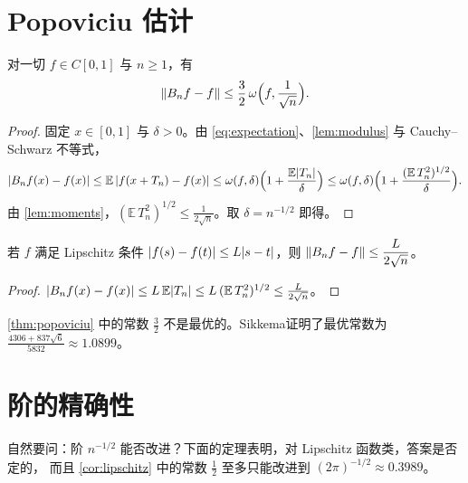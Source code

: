 \documentclass{mojing-paper}
\begin{document}
\section{Popoviciu 估计}

\begin{theorem}[Popoviciu]\label{thm:popoviciu}
对一切 $f\in C[0,1]$ 与 $n\ge1$，有
\[
  \lVert B_nf-f\rVert\le\frac32\,\omega\Bigl(f,\frac{1}{\sqrt n}\Bigr).
\]
\end{theorem}

\begin{proof}
固定 $x\in[0,1]$ 与 $\delta>0$。由 \cref{eq:expectation}、\cref{lem:modulus} 与 Cauchy--Schwarz 不等式，
\[
  \lvert B_nf(x)-f(x)\rvert\le\mathbb{E}\,\lvert f(x+T_n)-f(x)\rvert
  \le\omega(f,\delta)\Bigl(1+\frac{\mathbb{E}\lvert T_n\rvert}{\delta}\Bigr)
  \le\omega(f,\delta)\Bigl(1+\frac{(\mathbb{E}\,T_n^2)^{1/2}}{\delta}\Bigr).
\]
由 \cref{lem:moments}，$(\mathbb{E}\,T_n^2)^{1/2}\le\frac{1}{2\sqrt n}$。取 $\delta=n^{-1/2}$ 即得。
\end{proof}

\begin{corollary}\label{cor:lipschitz}
若 $f$ 满足 Lipschitz 条件 $\lvert f(s)-f(t)\rvert\le L\lvert s-t\rvert$，则 $\lVert B_nf-f\rVert\le\dfrac{L}{2\sqrt n}$。
\end{corollary}

\begin{proof}
$\lvert B_nf(x)-f(x)\rvert\le L\,\mathbb{E}\lvert T_n\rvert\le L\,(\mathbb{E}\,T_n^2)^{1/2}\le\frac{L}{2\sqrt n}$。
\end{proof}

\begin{remark}
\cref{thm:popoviciu} 中的常数 $\frac32$ 不是最优的。Sikkema\cite{sikkema1961}证明了最优常数为
$\frac{4306+837\sqrt6}{5832}\approx1.0899$。
\end{remark}

\section{阶的精确性}

自然要问：阶 $n^{-1/2}$ 能否改进？下面的定理表明，对 Lipschitz 函数类，答案是否定的，
而且 \cref{cor:lipschitz} 中的常数 $\frac12$ 至多只能改进到 $(2\pi)^{-1/2}\approx0.3989$。
\end{document}
